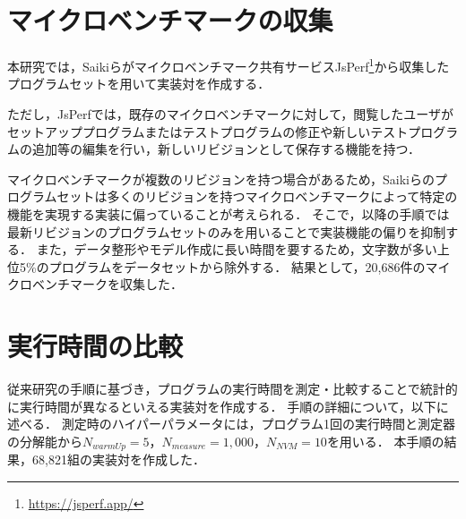 \documentclass[11pt]{jreport}
\begin{document}


\section{マイクロベンチマークの収集}\label{chapter:dataset:collect}


本研究では，Saikiら\cite{Saiki_2021}がマイクロベンチマーク共有サービスJsPerf\footnote{\url{https://jsperf.app/}}から収集したプログラムセットを用いて実装対を作成する．

ただし，JsPerfでは，既存のマイクロベンチマークに対して，閲覧したユーザがセットアッププログラムまたはテストプログラムの修正や新しいテストプログラムの追加等の編集を行い，新しいリビジョンとして保存する機能を持つ．

マイクロベンチマークが複数のリビジョンを持つ場合があるため，Saikiら\cite{Saiki_2021}のプログラムセットは多くのリビジョンを持つマイクロベンチマークによって特定の機能を実現する実装に偏っていることが考えられる．
そこで，以降の手順では最新リビジョンのプログラムセットのみを用いることで実装機能の偏りを抑制する．
また，データ整形やモデル作成に長い時間を要するため，文字数が多い上位5\%のプログラムをデータセットから除外する．
結果として，20,686件のマイクロベンチマークを収集した．




\section{実行時間の比較}\label{chapter:dataset:measure}


従来研究\cite{Selakovic_2016}の手順に基づき，プログラムの実行時間を測定・比較することで統計的に実行時間が異なるといえる実装対を作成する．
手順の詳細について，以下に述べる．
測定時のハイパーパラメータには，プログラム1回の実行時間と測定器の分解能から\begin{math}N_{warmUp}=5\end{math}，\begin{math}N_{measure}=1,000\end{math}，\begin{math}N_{NVM}=10\end{math}を用いる．
本手順の結果，68,821組の実装対を作成した．
\end{document}
